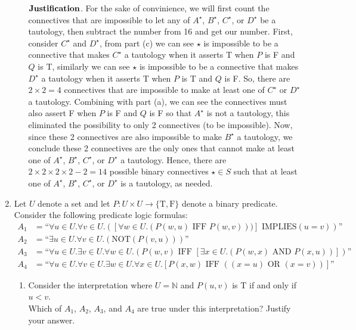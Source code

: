 \documentclass[11pt]{article}
\begin{document}
\begin{enumerate}
\begin{enumerate}
$\bold{Justification}$. For the sake of convinience, we will first count the connectives that are impossible to let any of $A^\star$, $B^\star$, $C^\star$, or $D^\star$ be a tautology, then subtract the number from 16 and get our number. First, consider $C^\star$ and $D^\star$, from part (c) we can see $\star$ is impossible to be a connective that makes $C^\star$ a tautology when it asserts T when $P$ is F and $Q$ is T, similarly we can see $\star$ is impossible to be a connective that makes $D^\star$ a tautology when it asserts T when $P$ is T and $Q$ is F. So, there are $2\times2=4$ connectives that are impossible to make at least one of $C^\star$ or $D^\star$ a tautology. Combining with part (a), we can see the connectives must also assert F when $P$ is F and $Q$ is F so that $A^\star$ is not a tautology, this eliminated the possibility to only 2 connectives (to be impossible). Now, since these 2 connectives are also impossible to make $B^\star$ a tautology, we conclude these 2 connectives are the only ones that cannot make at least one of $A^\star$, $B^\star$, $C^\star$, or $D^\star$ a tautology. Hence, there are $2\times2\times2\times2-2=14$ possible binary connectives $\star\in S$ such that at least one of $A^\star$, $B^\star$, $C^\star$, or $D^\star$ is a tautology, as needed.\\

\end{enumerate}



\item 
Let $U$ denote a set and let $P: U \times U \rightarrow \{\text{T}, \text{F}\}$ denote a binary predicate.
Consider the following predicate logic formulas:
\begin{align*}
    A_1 &= \mbox{``}\forall u \in U. \forall v \in U. ([\forall w \in U. (P(w,u) \mbox{ IFF } P(w,v)))] \mbox{ IMPLIES} (u=v))\mbox{''}\\
    A_2 &= \mbox{``}\exists u \in U. \forall v \in U. (\mbox{NOT}(P(v,u)))\mbox{''}\\
    A_3 &= \mbox{``}\forall u \in U. \exists v \in U. \forall w \in U. (P(w,v) \mbox{ IFF } [\exists x \in U.(P(w,x) \mbox{ AND } P(x,u))])\mbox{''}\\
    A_4 &= \mbox{``}\forall u \in U. \forall v \in U. \exists w \in U. \forall x \in U. [P(x,w) \mbox{ IFF } ((x=u) \mbox{ OR } (x = v))]\mbox{''}
\end{align*}
\begin{enumerate}

\item Consider the interpretation where $U = \mathbb{N}$ and $P(u,v)$ is T if and only if $u < v$.\\
Which of $A_1$, $A_2$, $A_3$, and $A_4$ are true under this interpretation? Justify your answer.


\end{enumerate}
\end{enumerate}
\end{document}
